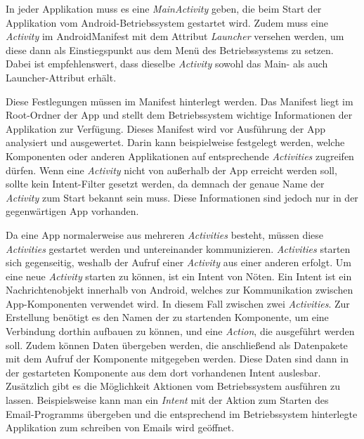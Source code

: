 In jeder Applikation muss es eine \textit{MainActivity} geben, die beim Start der Applikation vom Android-Betriebssystem gestartet wird. Zudem muss eine \textit{Activity} im AndroidManifest mit dem Attribut \textit{Launcher} versehen werden, um diese dann als Einstiegspunkt aus dem Menü des Betriebssystems zu setzen. Dabei ist empfehlenswert, dass dieselbe \textit{Activity} sowohl das Main- als auch Launcher-Attribut erhält.

Diese Festlegungen müssen im Manifest hinterlegt werden. Das Manifest liegt im Root-Ordner der App und stellt dem Betriebssystem wichtige Informationen der Applikation zur Verfügung. Dieses Manifest wird vor Ausführung der App analysiert und ausgewertet. Darin kann beispielweise festgelegt werden, welche Komponenten oder anderen Applikationen auf entsprechende \textit{Activities} zugreifen dürfen. Wenn eine \textit{Activity} nicht von außerhalb der App erreicht werden soll, sollte kein Intent-Filter gesetzt werden, da demnach der genaue Name der \textit{Activity} zum Start bekannt sein muss. Diese Informationen sind jedoch nur in der gegenwärtigen App vorhanden.

Da eine App normalerweise aus mehreren \textit{Activities} besteht, müssen diese \textit{Activities} gestartet werden und untereinander kommunizieren. \textit{Activities} starten sich gegenseitig, weshalb der Aufruf einer \textit{Activity} aus einer anderen erfolgt. Um eine neue \textit{Activity} starten zu können, ist ein Intent von Nöten.
Ein Intent ist ein Nachrichtenobjekt innerhalb von Android, welches zur Kommunikation zwischen App-Komponenten verwendet wird. In diesem Fall zwischen zwei \textit{Activities}. Zur Erstellung benötigt es den Namen der zu startenden Komponente, um eine Verbindung dorthin aufbauen zu können, und eine \textit{Action}, die ausgeführt werden soll. Zudem können Daten übergeben werden, die anschließend als Datenpakete mit dem Aufruf der Komponente mitgegeben werden. Diese Daten sind dann in der gestarteten Komponente aus dem dort vorhandenen Intent auslesbar. Zusätzlich gibt es die Möglichkeit Aktionen vom Betriebssystem ausführen zu lassen. Beispielsweise kann man ein \textit{Intent} mit der Aktion zum Starten des Email-Programms übergeben und die entsprechend im Betriebssystem hinterlegte Applikation zum schreiben von Emails wird geöffnet.

